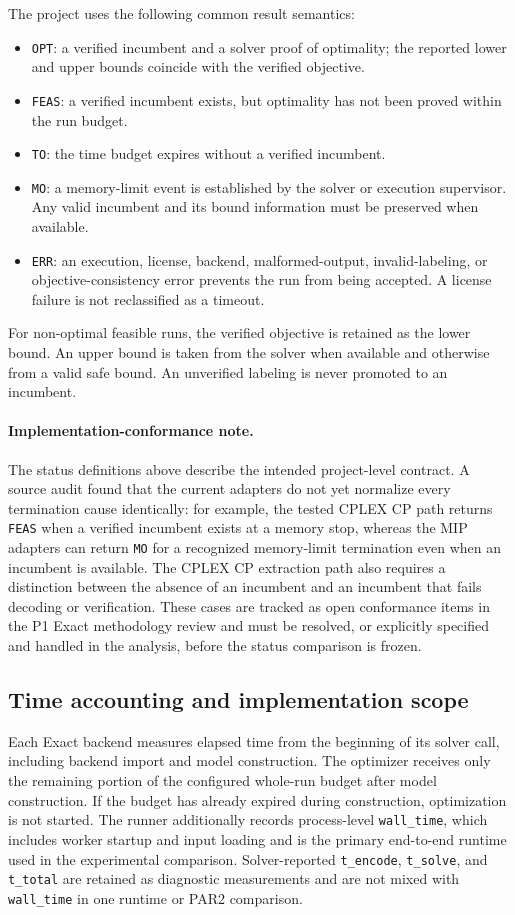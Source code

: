 The project uses the following common result semantics:
\begin{itemize}
  \item \texttt{OPT}: a verified incumbent and a solver proof of optimality; the reported lower and upper bounds coincide with the verified objective.
  \item \texttt{FEAS}: a verified incumbent exists, but optimality has not been proved within the run budget.
  \item \texttt{TO}: the time budget expires without a verified incumbent.
  \item \texttt{MO}: a memory-limit event is established by the solver or execution supervisor. Any valid incumbent and its bound information must be preserved when available.
  \item \texttt{ERR}: an execution, license, backend, malformed-output, invalid-labeling, or objective-consistency error prevents the run from being accepted. A license failure is not reclassified as a timeout.
\end{itemize}
For non-optimal feasible runs, the verified objective is retained as the lower bound. An upper bound is taken from the solver when available and otherwise from a valid safe bound. An unverified labeling is never promoted to an incumbent.

\paragraph{Implementation-conformance note.}
The status definitions above describe the intended project-level contract. A source audit found that the current adapters do not yet normalize every termination cause identically: for example, the tested CPLEX CP path returns \texttt{FEAS} when a verified incumbent exists at a memory stop, whereas the MIP adapters can return \texttt{MO} for a recognized memory-limit termination even when an incumbent is available. The CPLEX CP extraction path also requires a distinction between the absence of an incumbent and an incumbent that fails decoding or verification. These cases are tracked as open conformance items in the P1 Exact methodology review and must be resolved, or explicitly specified and handled in the analysis, before the status comparison is frozen.

\subsection{Time accounting and implementation scope}
Each Exact backend measures elapsed time from the beginning of its solver call, including backend import and model construction. The optimizer receives only the remaining portion of the configured whole-run budget after model construction. If the budget has already expired during construction, optimization is not started. The runner additionally records process-level \texttt{wall\_time}, which includes worker startup and input loading and is the primary end-to-end runtime used in the experimental comparison. Solver-reported \texttt{t\_encode}, \texttt{t\_solve}, and \texttt{t\_total} are retained as diagnostic measurements and are not mixed with \texttt{wall\_time} in one runtime or PAR2 comparison.

